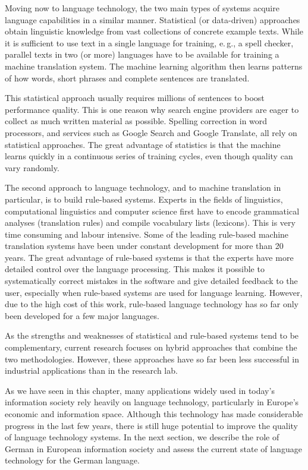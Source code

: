\begin{multicols}{2}
Moving now to language technology, the two main types of systems acquire language capabilities in a similar manner. Statistical (or data-driven) approaches obtain linguistic knowledge from vast collections of concrete example texts. While it is sufficient to use text in a single language for training, e.\,g., a spell checker, parallel texts in two (or more) languages have to be available for training a machine translation system. The machine learning algorithm then learns patterns of how words, short phrases and complete sentences are translated. 

This statistical approach usually requires millions of sentences to boost performance quality. This is one reason why search engine providers are eager to collect as much written material as possible. Spelling correction in word processors, and services such as Google Search and Google Translate, all rely on statistical approaches. The great advantage of statistics is that the machine learns quickly in a continuous series of training cycles, even though quality can vary randomly.

The second approach to language technology, and to machine translation in particular, is to build rule-based systems. Experts in the fields of linguistics, computational linguistics and computer science first have to encode grammatical analyses (translation rules) and compile vocabulary lists (lexicons). This is very time consuming and labour intensive. Some of the leading rule-based machine translation systems have been under constant development for more than 20 years. The great advantage of rule-based systems is that the experts have more detailed control over the language processing. This makes it possible to systematically correct mistakes in the software and give detailed feedback to the user, especially when rule-based systems are used for language learning. However, due to the high cost of this work, rule-based language technology has so far only been developed for a few major languages. 

As the strengths and weaknesses of statistical and rule-based systems tend to be complementary, current research focuses on hybrid approaches that combine the two methodologies. However, these approaches have so far been less successful in industrial applications than in the research lab. 

As we have seen in this chapter, many applications widely used in today’s information society rely heavily on language technology, particularly in Europe’s economic and information space. Although this technology has made considerable progress in the last few years, there is still huge potential to improve the quality of language technology systems. In the next section, we describe the role of German in European information society and assess the current state of language technology for the German language.
\end{multicols}

